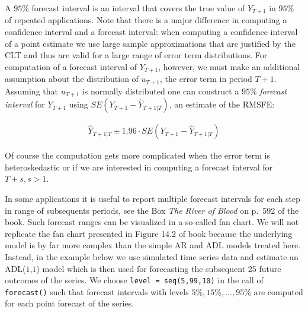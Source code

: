 \documentclass[]{book}
\theoremstyle{definition}
\theoremstyle{definition}
\theoremstyle{definition}
\theoremstyle{remark}
\begin{document}
A \(95\%\) forecast interval is an interval that covers the true value
of \(Y_{T+1}\) in \(95\%\) of repeated applications. Note that there is
a major difference in computing a confidence interval and a forecast
interval: when computing a confidence interval of a point estimate we
use large sample approximations that are justified by the CLT and thus
are valid for a large range of error term distributions. For computation
of a forecast interval of \(Y_{T+1}\), however, we must make an
additional assumption about the distribution of \(u_{T+1}\), the error
term in period \(T+1\). Assuming that \(u_{T+1}\) is normally
distributed one can construct a \(95\%\) \emph{forecast interval} for
\(Y_{T+1}\) using \(SE(Y_{T+1} - \widehat{Y}_{T+1\vert T})\), an
estimate of the RMSFE:

\begin{align*}
  \widehat{Y}_{T+1\vert T} \pm 1.96 \cdot SE(Y_{T+1} - \widehat{Y}_{T+1\vert T})
\end{align*}

Of course the computation gets more complicated when the error term is
heteroskedastic or if we are interested in computing a forecast interval
for \(T+s, s>1\).

In some applications it is useful to report multiple forecast intervals
for each step in range of subsequents periods, see the Box \emph{The
River of Blood} on p.~592 of the book. Such forecast ranges can be
visualized in a so-called fan chart. We will not replicate the fan chart
presented in Figure 14.2 of book because the underlying model is by far
more complex than the simple AR and ADL models treated here. Instead, in
the example below we use simulated time series data and estimate an
ADL(\(1\),\(1\)) model which is then used for forecasting the subsequent
25 future outcomes of the series. We choose
\texttt{level\ =\ seq(5,99,10)} in the call of \texttt{forecast()} such
that forecast intervals with levels \(5\%, 15\%, \dots, 95\%\) are
computed for each point forecast of the series.
\end{document}
